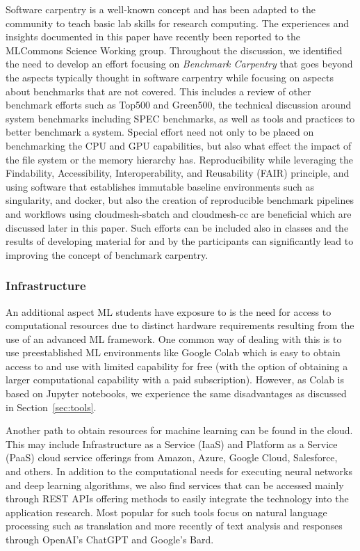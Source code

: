 \documentclass[utf8]{FrontiersinVancouver} %
\begin{document}
Software carpentry \citep{software-carpentry} is a well-known concept
and has been adapted to the community to teach basic lab skills for
research computing.  The experiences and insights documented in this paper have recently
been reported to the MLCommons Science Working group. Throughout the
discussion, we identified the need to develop an effort
focusing on {\em Benchmark Carpentry} that goes beyond the aspects
typically thought in software carpentry while focusing on aspects
about benchmarks that are not covered. This includes a review of other
benchmark efforts such as Top500 and Green500, the technical
discussion around system benchmarks including SPEC benchmarks, as well
as tools and practices to better benchmark a system. Special effort
need not only to be placed on benchmarking the CPU and GPU
capabilities, but also what effect the impact of the file system or
the memory hierarchy has. Reproducibility while leveraging the Findability, Accessibility, Interoperability, and Reusability (FAIR)
principle, and using software that establishes immutable baseline environments
such as singularity, and docker, but also the creation of reproducible
benchmark pipelines and workflows using cloudmesh-sbatch and
cloudmesh-cc are beneficial which are discussed later in this paper. Such efforts can be included also in
classes and the results of developing material for and by the
participants can significantly lead to improving the concept of
benchmark carpentry.

\subsubsection{Infrastructure}

An additional aspect ML students have exposure to is the need for access
to computational resources due to distinct hardware requirements resulting
from the use of an advanced ML framework. One common way of dealing with this
is to use preestablished ML environments like Google Colab which is easy to obtain access to and use with
limited capability for free (with the option of obtaining a larger
computational capability with a paid subscription).  However, as Colab
is based on Jupyter notebooks, we experience the same disadvantages
as discussed in Section~\ref{sec:tools}.

Another path to obtain resources for machine learning can be found in the cloud. This
may include Infrastructure as a Service (IaaS) and Platform as a
Service (PaaS) cloud service offerings from Amazon, Azure, Google Cloud, Salesforce,
and others.  In addition to the computational needs for executing
neural networks and deep learning algorithms, we also find services
that can be accessed mainly through REST APIs offering methods to easily integrate the technology into
the application research. Most popular for such tools focus on natural
language processing such as translation and more recently of text
analysis and responses through OpenAI's ChatGPT and Google's Bard.
\end{document}

